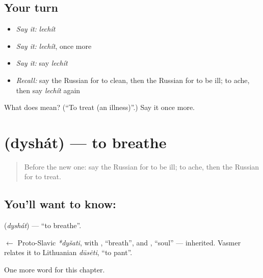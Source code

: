\subsection*{Your turn}
\begin{itemize}
\raggedright
  \item \emph{Say it:} \emph{lechít}
  \item \emph{Say it:} \emph{lechít}, once more
  \item \emph{Say it:} say \emph{lechít}
  \item \emph{Recall:} say the Russian for to clean, then the Russian for to be ill; to ache, then say \emph{lechít} again
\end{itemize}

\begin{tcolorbox}[breakable,colback=teal!4,colframe=teal!35!black,title={Before you move on}]
What does  mean? (\textquotedblleft{}To treat (an illness)\textquotedblright{}.) Say it once more.
\end{tcolorbox}
\section[\texorpdfstring{\ru{дышать} (dyshát)}{дышать (dyshát)}]{ (dyshát) — to breathe}

\label{lesson:RU-C207-dyshat}



\begin{quote}
Before the new one: say the Russian for to be ill; to ache, then the Russian for to treat.
\end{quote}

\subsection*{You'll want to know: }
\textbf{} (\emph{dyshát}) — \textquotedblleft{}to breathe\textquotedblright{}.

\begin{cousinweb}
\textbf{} $\leftarrow$ Proto-Slavic \emph{*dyšati}, with \emph{}, \textquotedblleft{}breath\textquotedblright{}, and \emph{}, \textquotedblleft{}soul\textquotedblright{} — inherited. Vasmer relates it to Lithuanian \emph{dūsėti}, \textquotedblleft{}to pant\textquotedblright{}.
\end{cousinweb}

\begin{grammarlens}[title={What you've built}]
One more word for this chapter.
\end{grammarlens}

